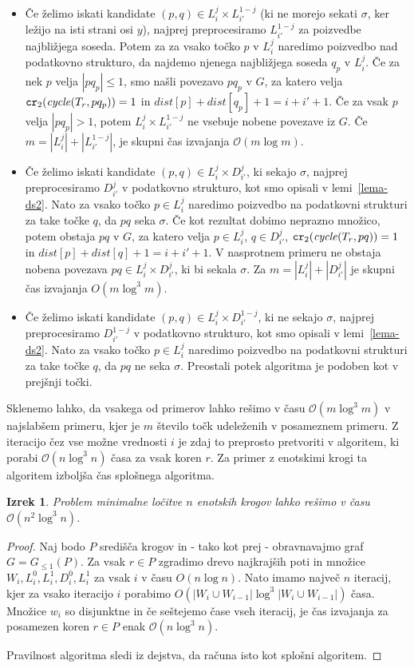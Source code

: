 \documentclass[a4paper, 12pt]{book}
\newcommand{\GG}{\ensuremath{G_{\le 1}}}
\newcommand{\OO}{\ensuremath{\mathcal{O}}} %
\newtheorem{izrek}{Izrek}[chapter]
\def\dist{\mathit{dist}}
\newcommand{\cycle}{\mathit{cycle}}
\newcommand\CR{\mbox{\tt cr}_2}		  %
\begin{document}
\begin{itemize}
\item Če želimo iskati kandidate $(p,q)\in L_i^j\times L_{i'}^{1-j}$ (ki ne morejo sekati $\sigma$, ker ležijo na isti strani osi $y$), najprej preprocesiramo $L_{i'}^{1-j}$ za poizvedbe najbližjega soseda. Potem za za vsako točko $p$ v $L_i^j$ naredimo poizvedbo nad podatkovno strukturo, da najdemo njenega najbližjega soseda $q_p$ v $L_i^j$. Če za nek $p$ velja $|pq_p|\le 1$, smo našli povezavo $pq_p$ v $G$, za katero velja $\CR(\cycle(T_r,pq_p))=1$ in $\dist[p]+\dist[q_p]+1=i+i'+1$. Če za vsak $p$ velja $|pq_p|> 1$, potem $L_i^j\times L_{i'}^{1-j}$ ne vsebuje nobene povezave iz $G$. Če $m=|L_i^j|+|L_{i'}^{1-j}|$, je skupni čas izvajanja $\OO(m\log m)$.
\item Če želimo iskati kandidate $(p,q)\in L_i^j\times D_{i'}^{j}$, ki sekajo $\sigma$, najprej preprocesiramo $D_{i'}^{j}$ v podatkovno strukturo, kot smo opisali v lemi~\ref{lema-ds2}. Nato za vsako točko $p\in L_i^j$ naredimo poizvedbo na podatkovni strukturi za take točke $q$, da $pq$ seka $\sigma$. Če kot rezultat dobimo neprazno množico, potem obstaja $pq$ v $G$, za katero velja $p\in L_i^j$, $q\in D_{i'}^{j}$, $\CR(\cycle(T_r,pq))=1$ in $\dist[p]+\dist[q]+1=i+i'+1$. V nasprotnem primeru ne obstaja nobena povezava $pq\in L_i^j\times D_{i'}^{j}$, ki bi sekala $\sigma$. Za $m=|L_i^j|+|D_{i'}^{j}|$ je skupni čas izvajanja  $O(m\log^3 m)$.
\item Če želimo iskati kandidate $(p,q)\in L_i^j\times D_{i'}^{1-j}$, ki ne sekajo $\sigma$, najprej preprocesiramo $D_{i'}^{1-j}$ v podatkovno strukturo, kot smo opisali v lemi~\ref{lema-ds2}. Nato za vsako točko $p\in L_i^j$ naredimo poizvedbo na podatkovni strukturi za take točke $q$, da $pq$ ne seka $\sigma$. Preostali potek algoritma je podoben kot v prejšnji točki. 
\end{itemize}
Sklenemo lahko, da vsakega od primerov lahko rešimo v času $\OO(m\log^3m)$ v najslabšem primeru, kjer je $m$ število točk udeleženih v posameznem primeru. Z iteracijo čez vse možne vrednosti $i$ je zdaj to preprosto pretvoriti v algoritem, ki porabi $\OO(n\log^3n)$ časa za vsak koren $r$. Za primer z enotskimi krogi ta algoritem izboljša čas splošnega algoritma. 
\begin{izrek}
\label{lema4}
Problem minimalne ločitve $n$ enotskih krogov lahko rešimo v času $\OO(n^2\log^3n)$.
\end{izrek}

\begin{proof}
Naj bodo $P$ središča krogov in - tako kot prej - obravnavajmo graf $G=\GG(P)$. Za vsak $r\in P$ zgradimo drevo najkrajših poti in množice $W_i,L_i^0,L_i^1,D_i^0,L_i^1$ za vsak $i$ v času $O(n\log n)$. Nato imamo največ $n$ iteracij, kjer za vsako iteracijo $i$ porabimo $O(|W_i\cup W_{i-1}|\log^3 |W_i\cup W_{i-1}|)$ časa. Množice $w_i$ so disjunktne in če seštejemo čase vseh iteracij, je čas izvajanja za posamezen koren $r\in P$ enak $\OO(n\log^3n)$.

Pravilnost algoritma sledi iz dejstva, da računa isto kot splošni algoritem.
\end{proof}
\end{document}
